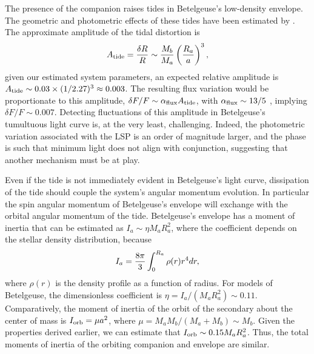 \documentclass[twocolumn]{aastex631}
\begin{document}
The presence of the companion raises tides in Betelgeuse's low-density envelope. The geometric and photometric effects of these tides have been estimated by \citet{2022MNRAS.516.5021A}.  The approximate amplitude of the tidal distortion is 
\begin{equation}
    A_{\rm tide} = \frac{\delta R}{R} \sim \frac{M_b}{M_a}\left(\frac{R_a}{a}\right)^3,
\end{equation}
given our estimated system parameters, an expected relative amplitude is $A_{\rm tide} \sim 0.03\times (1/2.27)^3 \approx 0.003$. The resulting flux variation would be proportionate to this amplitude, $\delta F/F \sim \alpha_{\rm flux} A_{\rm tide}$, with $\alpha_{\rm flux}\sim 13/5$ \citep{2022MNRAS.516.5021A}, implying $\delta F/F \sim0.007$. Detecting fluctuations of this amplitude in Betelgeuse's tumultuous light curve is, at the very least, challenging.  Indeed, the photometric variation associated with the LSP is an order of magnitude larger, and the phase is such that minimum light does not align with conjunction, suggesting that another mechanism must be at play. 

Even if the tide is not immediately evident in Betelgeuse's light curve, dissipation of the tide should couple the system's angular momentum evolution. In particular the spin angular momentum of Betelgeuse's envelope will exchange with the orbital angular momentum of the tide. Betelgeuse's envelope has a moment of inertia that can be estimated as $I_a \sim \eta M_a R_a^2$, where the coefficient depends on the stellar density distribution, because 
\begin{equation}
    I_a = {8\pi \over 3} \int_0^{R_a} \rho(r) r^4 dr, 
\end{equation}
where $\rho(r)$ is the density profile as a function of radius. For models of Betelgeuse, the dimensionless coefficient is $\eta = I_a/(M_a R_a^2) \sim 0.11$. Comparatively, the moment of inertia of the orbit of the secondary about the center of mass is $I_{\rm orb} = \mu a^2$, where $\mu = M_a M_b/(M_a+M_b) \sim M_b$. Given the properties derived earlier, we can estimate that $I_{\rm orb} \sim 0.15 M_a R_a^2$. Thus, the total moments of inertia of the orbiting companion and envelope are similar. 
\end{document}
